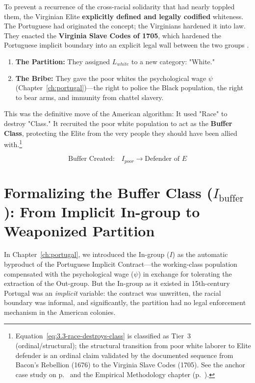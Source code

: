 To prevent a recurrence of the cross-racial solidarity that had nearly toppled them, the Virginian Elite \textbf{explicitly defined and legally codified} whiteness. The Portuguese had originated the concept; the Virginians hardened it into law. They enacted the \textbf{Virginia Slave Codes of 1705}, which hardened the Portuguese implicit boundary into an explicit legal wall between the two groups \cite{allen, kendi}.

\begin{enumerate}
    \item \textbf{The Partition:} They assigned $L_{white}$ to a new category: "White."
    \item \textbf{The Bribe:} They gave the poor whites the psychological wage $\psi$ (Chapter~\ref{ch:portugal})---the right to police the Black population, the right to bear arms, and immunity from chattel slavery.
\end{enumerate}

This was the definitive move of the American algorithm: It used "Race" to destroy "Class." It recruited the poor white population to act as the \textbf{Buffer Class}, protecting the Elite from the very people they should have been allied with.\footnote{Equation~\ref{eq:3.3-race-destroys-class} is classified as Tier~3 (ordinal/structural); the structural transition from poor white laborer to Elite defender is an ordinal claim validated by the documented sequence from Bacon's Rebellion (1676) to the Virginia Slave Codes (1705). See the anchor case study on p.~\pageref{cs:bacons_rebellion} and the Empirical Methodology chapter (p.~\pageref{ch:empirical_methodology}).}

\begin{equation}\label{eq:3.3-race-destroys-class}
\text{Buffer Created:} \quad I_{poor} \rightarrow \text{Defender of } E
\end{equation}

\section{Formalizing the Buffer Class ($I_{\text{buffer}}$): From Implicit In-group to Weaponized Partition}

In Chapter~\ref{ch:portugal}, we introduced the In-group ($I$) as the automatic byproduct of the Portuguese Implicit Contract---the working-class population compensated with the psychological wage ($\psi$) in exchange for tolerating the extraction of the Out-group. But the In-group as it existed in 15th-century Portugal was an \textit{implicit} variable: the contract was unwritten, the racial boundary was informal, and significantly, the partition had no legal enforcement mechanism in the American colonies.

